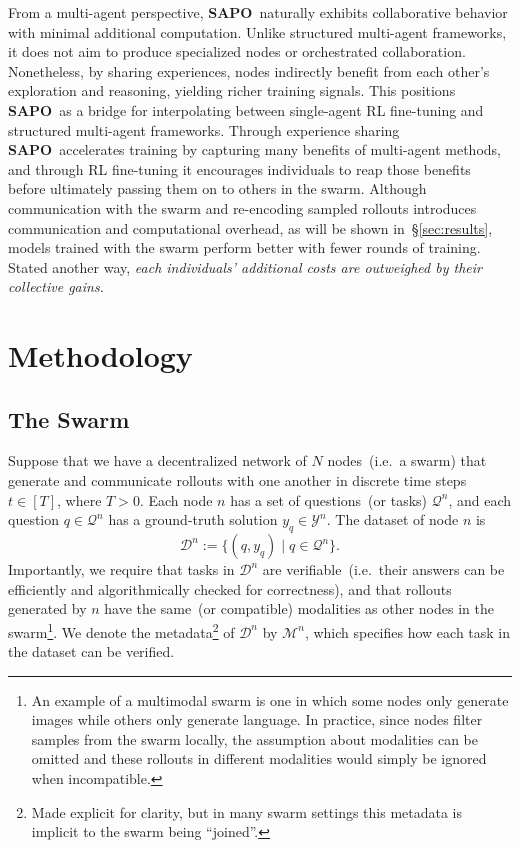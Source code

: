 \documentclass[11pt, a4paper, logo, singlecolumn, copyright]{gensyn}
\newcommand{\SAPO}{\textbf{SAPO}}
\begin{document}
From a multi-agent perspective, \SAPO~naturally exhibits collaborative behavior with minimal additional computation. Unlike structured multi-agent frameworks, it does not aim to produce specialized nodes or orchestrated collaboration. Nonetheless, by sharing experiences, nodes indirectly benefit from each other’s exploration and reasoning, yielding richer training signals. This positions \SAPO~as a bridge for interpolating between single-agent RL fine-tuning and structured multi-agent frameworks. Through experience sharing \SAPO~accelerates training by capturing many benefits of multi-agent methods, and through RL fine-tuning it encourages individuals to reap those benefits before ultimately passing them on to others in the swarm. Although communication with the swarm and re-encoding sampled rollouts introduces communication and computational overhead, as will be shown in~\S\ref{sec:results}, models trained with the swarm perform better with fewer rounds of training.
Stated another way, \textit{each individuals' additional costs are outweighed by their collective gains.}

\section{Methodology}\label{sec:prelims}

\subsection{The Swarm}\label{subsec:swarm}
Suppose that we have a decentralized network of $N$ nodes~(i.e.~a swarm) that generate and communicate rollouts with one another in discrete time steps $t \in [T]$, where $T > 0$. Each node $n$ has a set of questions~(or tasks) $\mathcal{Q}^n$, and each question $q \in \mathcal{Q}^n$ has a ground-truth solution $y_q \in \mathcal{Y}^n$. The dataset of node $n$ is
\[
\mathcal{D}^n := \{(q, y_q) \mid q \in \mathcal{Q}^n\}.
\]
Importantly, we require that tasks in $\mathcal{D}^n$ are verifiable~(i.e.~their answers can be efficiently and algorithmically checked for correctness), and that rollouts generated by $n$ have the same~(or compatible) modalities as other nodes in the swarm\footnote{An example of a multimodal swarm is one in which some nodes only generate images while others only generate language. In practice, since nodes filter samples from the swarm locally, the assumption about modalities can be omitted and these rollouts in different modalities would simply be ignored when incompatible.}. We denote the metadata\footnote{Made explicit for clarity, but in many swarm settings this metadata is implicit to the swarm being ``joined''.} of $\mathcal{D}^n$ by $\mathcal{M}^n$, which specifies how each task in the dataset can be verified.
\end{document}
